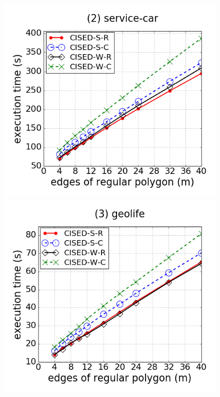 \begin{figure}[tb!]
\centering
\includegraphics[scale = 0.240]{Figures/Exp-M-e-60-time-service.png}
\includegraphics[scale = 0.240]{Figures/Exp-M-e-60-time-geolife.png}

\end{figure}

